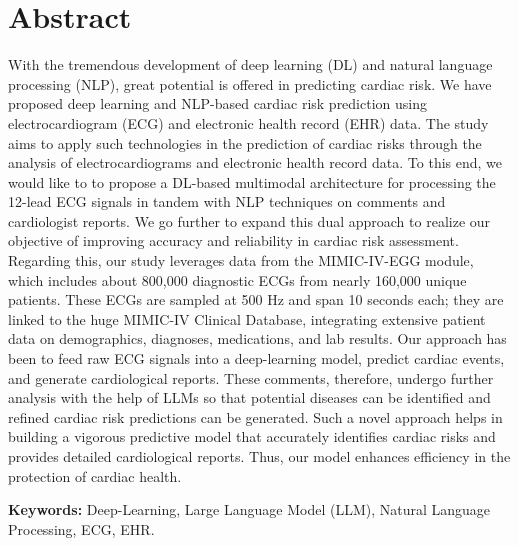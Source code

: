 \section*{Abstract}
With the tremendous development of deep learning (DL) and natural language processing (NLP), great potential is offered in predicting cardiac risk. We have proposed deep learning and NLP-based cardiac risk prediction using electrocardiogram (ECG) and electronic health record (EHR) data. The study aims to apply such technologies in the prediction of cardiac risks through the analysis of electrocardiograms and electronic health record data. To this end, we would like to to propose a DL-based multimodal architecture for processing the 12-lead ECG signals in tandem with NLP techniques on comments and cardiologist reports. We go further to expand this dual approach to realize our objective of improving accuracy and reliability in cardiac risk assessment. Regarding this, our study leverages data from the MIMIC-IV-EGG module, which includes about 800,000 diagnostic ECGs from nearly 160,000 unique patients. These ECGs are sampled at 500 Hz and span 10 seconds each; they are linked to the huge MIMIC-IV Clinical Database, integrating extensive patient data on demographics, diagnoses, medications, and lab results. Our approach has been to feed raw ECG signals into a deep-learning model, predict cardiac events, and generate cardiological reports. These comments, therefore, undergo further analysis with the help of LLMs so that potential diseases can be identified and refined cardiac risk predictions can be generated. Such a novel approach helps in building a vigorous predictive model that accurately identifies cardiac risks and provides detailed cardiological reports. Thus, our model enhances efficiency in the protection of cardiac health.


\vspace{1cm}
\textbf{Keywords:} Deep-Learning, Large Language Model (LLM), Natural Language Processing, ECG, EHR.
\pagebreak
